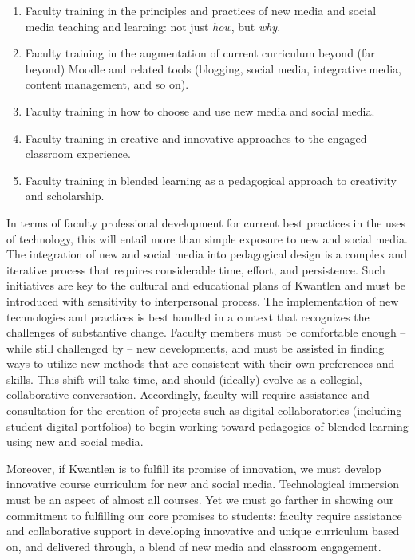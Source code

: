 \documentclass[10pt, letterpaper]{article}
\begin{document}
\begin{enumerate}
\item Faculty training in the principles and practices of new media and social media teaching and learning: not just \textit{how}, but \textit{why}.
\item Faculty training in the augmentation of current curriculum beyond (far beyond) Moodle and related tools (blogging, social media, integrative media, content management, and so on).
\item Faculty training in how to choose and use new media and social media.
\item Faculty training in creative and innovative approaches to the engaged classroom experience.
\item Faculty training in blended learning as a pedagogical approach to creativity and scholarship.
\end{enumerate}

In terms of faculty professional development for current best practices in the uses of technology, this will entail more than simple exposure to new and social media. The integration of new and social media into pedagogical design is a complex and iterative process that requires considerable time, effort, and persistence. Such initiatives are key to the cultural and educational plans of Kwantlen and must be introduced with sensitivity to interpersonal process. The implementation of new technologies and practices is best handled in a context that recognizes the challenges of substantive change. Faculty members must be comfortable enough -- while still challenged by -- new developments, and must be assisted in finding ways to utilize new methods that are consistent with their own preferences and skills. This shift will take time, and should (ideally) evolve as a collegial, collaborative conversation. Accordingly, faculty will require assistance and consultation for the creation of projects such as digital collaboratories (including student digital portfolios) to begin working toward pedagogies of blended learning using new and social media.

Moreover, if Kwantlen is to fulfill its promise of innovation, we must develop innovative course curriculum for new and social media. Technological immersion must be an aspect of almost all courses. Yet we must go farther in showing our commitment to fulfilling our core promises to students: faculty require assistance and collaborative support in developing innovative and unique curriculum based on, and delivered through, a blend of new media and classroom engagement.
\end{document}
